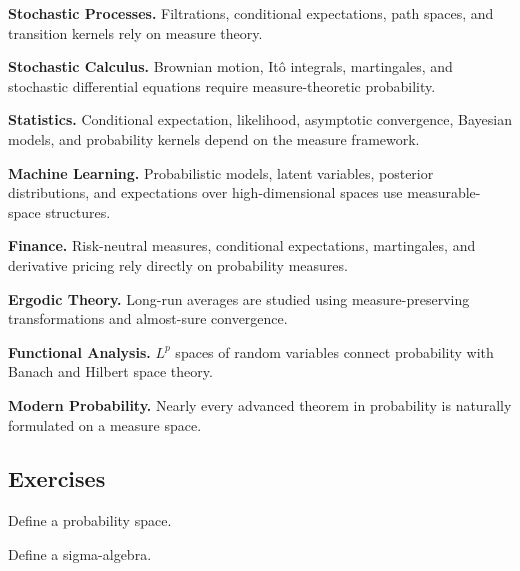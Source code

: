 \begin{applicationbox}

\textbf{Stochastic Processes.}
Filtrations, conditional expectations, path spaces, and transition
kernels rely on measure theory.

\medskip

\textbf{Stochastic Calculus.}
Brownian motion, It\^o integrals, martingales, and stochastic
differential equations require measure-theoretic probability.

\medskip

\textbf{Statistics.}
Conditional expectation, likelihood, asymptotic convergence, Bayesian
models, and probability kernels depend on the measure framework.

\medskip

\textbf{Machine Learning.}
Probabilistic models, latent variables, posterior distributions, and
expectations over high-dimensional spaces use measurable-space
structures.

\medskip

\textbf{Finance.}
Risk-neutral measures, conditional expectations, martingales, and
derivative pricing rely directly on probability measures.

\medskip

\textbf{Ergodic Theory.}
Long-run averages are studied using measure-preserving transformations
and almost-sure convergence.

\medskip

\textbf{Functional Analysis.}
\(L^p\) spaces of random variables connect probability with Banach and
Hilbert space theory.

\medskip

\textbf{Modern Probability.}
Nearly every advanced theorem in probability is naturally formulated on
a measure space.

\end{applicationbox}

\subsection{Exercises}
\label{subsec:measure-probability-exercises}

\begin{exercise}[1]
Define a probability space.
\end{exercise}

\begin{exercise}[1]
Define a sigma-algebra.
\end{exercise}

